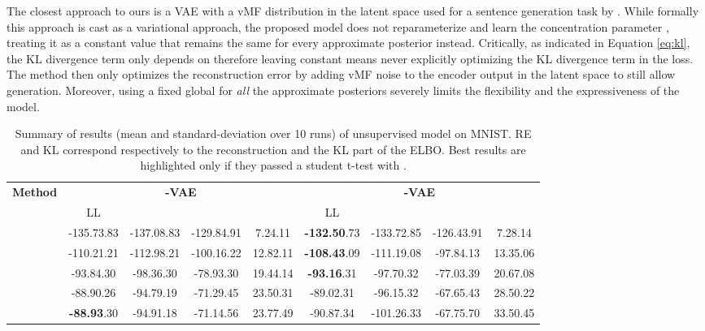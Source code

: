 \documentclass[letterpaper]{article}
\begin{document}
The closest approach to ours is a VAE with a vMF distribution in the latent space used for a sentence generation task by \citep{guu2017generating}. While formally this approach is cast as a variational approach, the proposed model does not reparameterize and learn the concentration parameter , treating it as a constant value that remains the same for every approximate posterior instead. Critically, as indicated in Equation \ref{eq:kl}, the KL divergence term only depends on  therefore leaving  constant means never explicitly optimizing the KL divergence term in the loss. The method then only optimizes the reconstruction error by adding vMF noise to the encoder output in the latent space to still allow generation. Moreover, using a fixed global  for \textit{all} the approximate posteriors severely limits the flexibility and the expressiveness of the model.
 
\begin{table*}[t]
\centering
\caption{Summary of results (mean and standard-deviation over 10 runs) of unsupervised model on MNIST. RE and KL correspond respectively to the reconstruction and the KL part of the ELBO. Best results are highlighted only if they passed a student t-test with .}
\bigskip
  
  \bgroup
  \setlength\tabcolsep{.5em}

  \begin{tabular}{l|cccc|cccc}
    \toprule
    \multirow{2}{*}{\textbf{Method}} &
        \multicolumn{4}{c}{\textbf{-VAE}} &
        \multicolumn{4}{c}{\textbf{-VAE}}
        \\
        & LL &  &  &  & LL &  &  &  \\
    \midrule
&-135.73{\tiny.83}&-137.08{\tiny.83}&-129.84{\tiny.91}&7.24{\tiny.11}&\textbf{-132.50}{\tiny.73}&-133.72{\tiny.85}&-126.43{\tiny.91}&7.28{\tiny.14}\\
&-110.21{\tiny.21}&-112.98{\tiny.21}&-100.16{\tiny.22}&12.82{\tiny.11}&\textbf{-108.43}{\tiny.09}&-111.19{\tiny.08}&-97.84{\tiny.13}&13.35{\tiny.06}\\
&-93.84{\tiny.30}&-98.36{\tiny.30}&-78.93{\tiny.30}&19.44{\tiny.14}&\textbf{-93.16}{\tiny.31}&-97.70{\tiny.32}&-77.03{\tiny.39}&20.67{\tiny.08}\\
&-88.90{\tiny.26}&-94.79{\tiny.19}&-71.29{\tiny.45}&23.50{\tiny.31}&-89.02{\tiny.31}&-96.15{\tiny.32}&-67.65{\tiny.43}&28.50{\tiny.22}\\
&\textbf{-88.93}{\tiny.30}&-94.91{\tiny.18}&-71.14{\tiny.56}&23.77{\tiny.49}&-90.87{\tiny.34}&-101.26{\tiny.33}&-67.75{\tiny.70}&33.50{\tiny.45}\\
    \bottomrule
  \end{tabular}
  \egroup
  \label{tab:mnist}
\end{table*}
 
\end{document}

